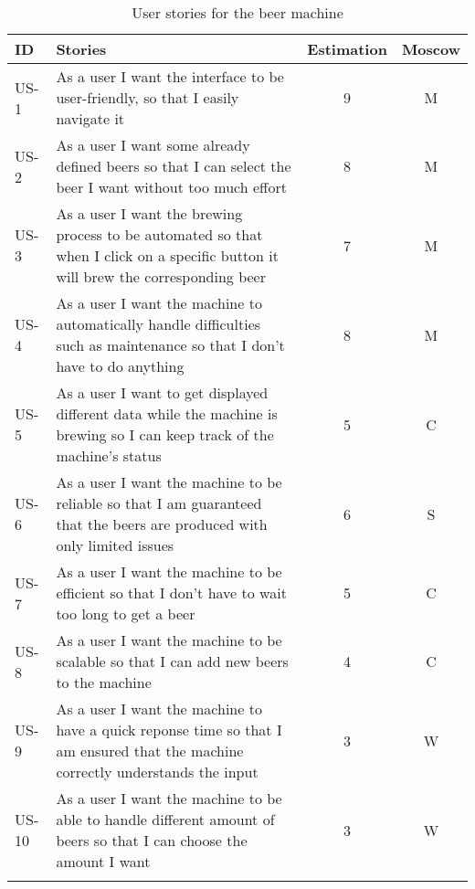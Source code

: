 \begin{table}[H]
    \begin{center}
        \sloppy
        \begin{longtable}{|p{1cm}|p{11cm}|c|c|}
            \hline
            ID    & Stories                                                                                                                                    & Estimation & Moscow \\ \hline
            US-1  & As a user I want the interface to be user-friendly, so that I easily navigate it                                                           & 9          & M      \\ \hline
            US-2  & As a user I want some already defined beers so that I can select the beer I want without too much effort                                   & 8          & M      \\ \hline
            US-3  & As a user I want the brewing process to be automated so that when I click on a specific button it will brew the corresponding beer         & 7          & M      \\ \hline
            US-4  & As a user I want the machine to automatically handle difficulties such as maintenance so that I don't have to do anything                  & 8          & M      \\ \hline
            US-5  & As a user I want to get displayed different data while the machine is brewing so I can keep track of the machine's status                  & 5          & C      \\ \hline
            US-6  & As a user I want the machine to be reliable so that I am guaranteed that the beers are produced with only limited issues                   & 6          & S      \\ \hline
            US-7  & As a user I want the machine to be efficient so that I don't have to wait too long to get a beer                                           & 5          & C      \\ \hline
            US-8  & As a user I want the machine to be scalable so that I can add new beers to the machine                                                     & 4          & C      \\ \hline
            US-9  & As a user I want the machine to have a quick reponse time so that I am ensured that the machine correctly understands the input            & 3          & W      \\ \hline
            US-10 & As a user I want the machine to be able to handle different amount of beers so that I can choose the amount I want                         & 3          & W      \\ \hline

            \caption{User stories for the beer machine}
            \label{tab:user_stories}
        \end{longtable}
    \end{center}
\end{table}